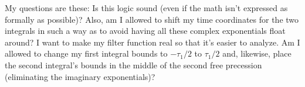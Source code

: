 \documentclass[12pt]{article}
\begin{document}
My questions are these: Is this logic sound (even if the math isn't expressed as formally as possible)? Also, am I allowed to shift my time coordinates for the two integrals in such a way as to avoid having all these complex exponentials float around? I want to make my filter function real so that it's easier to analyze. Am I allowed to change my first integral bounds to $-\tau_1/2$ to $\tau_1/2$ and, likewise, place the second integral's bounds in the middle of the second free precession (eliminating the imaginary exponentials)?
\end{document}
